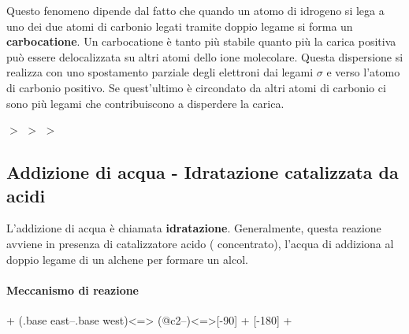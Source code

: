 Questo fenomeno dipende dal fatto che quando un atomo di idrogeno si lega a uno dei due atomi di carbonio legati tramite doppio legame si forma un \textbf{carbocatione}. Un carbocatione è tanto più stabile quanto più la carica positiva può essere delocalizzata su altri atomi dello ione molecolare. Questa dispersione si realizza con uno spostamento parziale degli elettroni dai legami \(\sigma\)  e  verso l'atomo di carbonio positivo. Se quest'ultimo è circondato da altri atomi di carbonio ci sono più legami che contribuiscono a disperdere la carica.
\chemnameinit{}
\begin{reaction*}
	\quad $>$ \quad
	\quad $>$ \quad
	\quad $>$ \quad
\end{reaction*}


\subsection{Addizione di acqua - Idratazione catalizzata da acidi}
L'addizione di acqua è chiamata \textbf{idratazione}. Generalmente, questa reazione avviene in presenza di catalizzatore acido ( concentrato), l'acqua di addiziona al doppio legame di un alchene per formare un alcol.

\paragraph{Meccanismo di reazione}
\begin{reaction}
	 + 
	\arrow(.base east--.base west){<=>}
	 \+{.5em,.5em} 
	\arrow(@c2--){<=>}[-90]
	 + 
	\arrow{<=>}[-180]
	 + 
\end{reaction}

